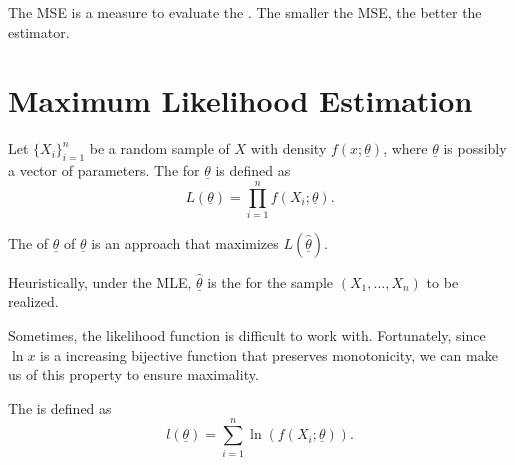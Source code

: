 \documentclass[notoc,notitlepage]{tufte-book}
\begin{document}
\begin{note}
  The MSE is a measure to evaluate the . The
  smaller the MSE, the better the estimator.
\end{note}


\section{Maximum Likelihood Estimation}%
\label{sec:maximum_likelihood_estimation}

\begin{defn}\label{defn:likelihood_function}
  Let $\{X_i\}_{i=1}^n$ be a random sample of $X$ with density $f(x;
  \underline{\theta})$, where $\underline{\theta}$ is possibly a vector of
  parameters. The  for $\underline{\theta}$ is
  defined as
  \begin{equation*}
    L(\underline{\theta}) = \prod_{i=1}^{n} f(X_i; \underline{\theta}).
  \end{equation*}
\end{defn}

\begin{defn}\label{defn:maximum_likelihood_estimation}
  The  of $\hat{\underline{\theta}}$ of
  $\underline{\theta}$ is an approach that maximizes $L(\hat{\underline{\theta}})$.
\end{defn}

\begin{note}
  Heuristically, under the MLE, $\hat{\underline{\theta}}$ is the  for the sample $(X_1, \ldots, X_n)$ to be realized.
\end{note}

Sometimes, the likelihood function is difficult to work with. Fortunately, since
$\ln x$ is a increasing bijective function that preserves monotonicity, we can
make us of this property to ensure maximality.

\begin{defn}\label{defn:log_likelihood_function}
  The  is defined as
  \begin{equation*}
    l(\underline{\theta}) = \sum_{i=1}^{n} \ln (f(X_i; \underline{\theta})).
  \end{equation*}
\end{defn}
\end{document}
